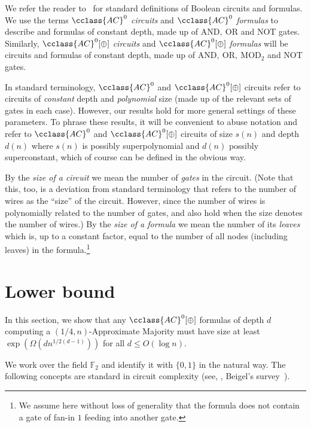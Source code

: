 \documentclass{toc}
\newcommand{\F}{\mathbb{F}}
\newcommand{\AC}{\cclass{AC}}
\begin{document}
We refer the reader to~\cite{AroraBarak, Jukna} for standard definitions of
Boolean circuits and formulas. We use
%
the terms  %
%
%
\emph{$\AC^0$ circuits} and \emph{$\AC^0$ formulas} to describe
%
%
and formulas %
of constant depth,   %
made up of
$\mathrm{AND},\ \mathrm{OR}$ and $\mathrm{NOT}$ gates. 
Similarly, %
\emph{$\AC^0[\oplus]$ circuits}
%
and %
%
\emph{$\AC^0[\oplus]$ formulas}
will be circuits
%
%
and formulas %
of constant depth,   %
made up of $\mathrm{AND},\ \mathrm{OR},\ \mathrm{MOD}_2$ 
and $\mathrm{NOT}$ gates.
%
%
\begin{remark}
%
%
%
%
In standard terminology, $\AC^0$ and $\AC^0[\oplus]$ circuits refer to circuits of \emph{constant} depth and \emph{polynomial} size (made up of the relevant sets of gates in each case). However, our results hold for more general settings of these parameters. To phrase these results, it will be convenient to abuse notation and refer to $\AC^0$ and $\AC^0[\oplus]$ circuits of size $s(n)$ and depth $d(n)$ where $s(n)$ is possibly superpolynomial and $d(n)$ possibly superconstant, which of course can be defined in the obvious way.
\end{remark}
%
%
%
%
%
By the \emph{size of a circuit} we mean the number of \emph{gates}
in the circuit.  (Note that this, too, is a deviation from standard
terminology that refers to the number of wires as the ``size'' of
%
%
the circuit. However, since the number of wires is polynomially related to the number of gates,  and  also hold when the size denotes the number of wires.)
%
By the \emph{size of a formula} we mean the number of its \emph{leaves}
%
which is, %
up to a constant factor, equal to
%
the number of all nodes (including leaves)
in the formula.\footnote{We assume here without loss of generality
that the formula does not contain a gate of fan-in $1$ feeding into
%
another gate.}  %

%
\section{Lower bound}    %
\label{sec:lbd}

In this section, we show that any $\AC^0[\oplus]$ formulas of depth $d$
computing a $(1/4,n)$-Approximate Majority must have size at least
$\exp(\Omega(dn^{1/2(d-1)}))$ for all $d \le O(\log n)$. 

We work over the field $\F_2$ and identify it with $\{0,1\}$ in the
natural way. The following concepts are standard in circuit complexity
(see, \eg, Beigel's survey~\cite{Beigelpolysurvey}).
\end{document}
